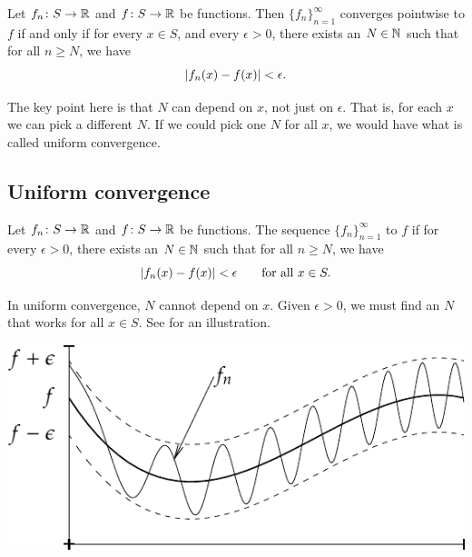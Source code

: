 \begin{prop} \label{ptwsconv:prop}
Let $f_n \colon S \to {\mathbb{R}}$ and $f \colon S \to {\mathbb{R}}$ be functions.
Then $\{ f_n \}_{n=1}^\infty$ converges pointwise to $f$ if and only if
for every $x \in S$, and every $\epsilon > 0$, there exists
an $N \in {\mathbb{N}}$ such that for all
$n \geq N$, we have
\begin{equation*}
\left\lvert {f_n(x)-f(x)} \right\rvert < \epsilon .
\end{equation*}
\end{prop}

The key point here is that $N$ can depend on $x$, not just on
$\epsilon$.  That is, for each $x$ we can pick a different $N$.
If we could pick one $N$ for all $x$, we would have what is called
uniform convergence.

\subsection{Uniform convergence}

\begin{defn}
Let $f_n \colon S \to {\mathbb{R}}$
and $f \colon S \to {\mathbb{R}}$
be functions.  The sequence $\{ f_n \}_{n=1}^\infty$
\emph{} to $f$ if for
every $\epsilon > 0$, there exists an $N \in {\mathbb{N}}$ such that 
for all $n \geq N$, we have
\begin{equation*}
\left\lvert {f_n(x) - f(x)} \right\rvert < \epsilon \qquad \text{for all } x \in S.
\end{equation*}
\end{defn}

In uniform convergence, $N$ cannot depend on $x$.  Given $\epsilon > 0$,
we must find an $N$ that works for all $x \in S$.  See
 for an illustration.
\begin{myfigureht}
\includegraphics{figures/uniformconv}
\caption{In uniform convergence,
for $n \geq N$,
the functions $f_n$ are within a strip of $\pm\epsilon$ from $f$.%
\label{fig:uniformconv}}
\end{myfigureht}

